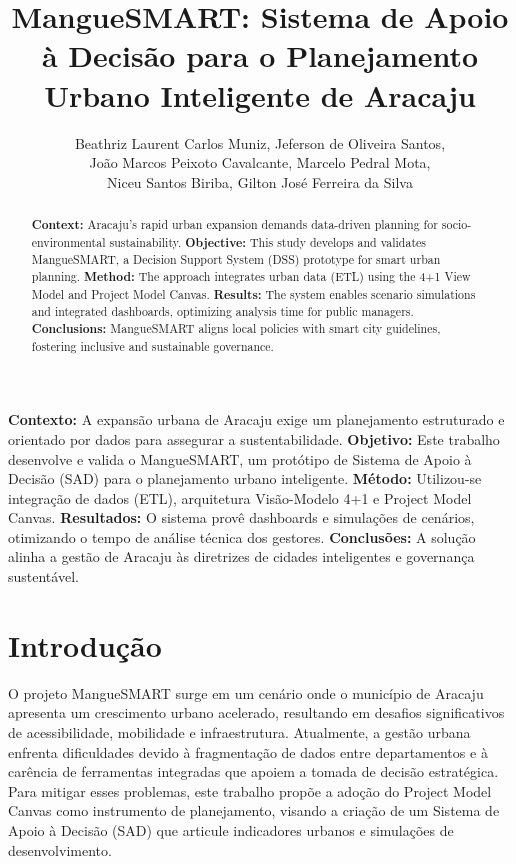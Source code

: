 \documentclass[12pt]{article}
\title{MangueSMART: Sistema de Apoio à Decisão para o Planejamento Urbano Inteligente de Aracaju}
\author{Beathriz Laurent Carlos Muniz\inst{1}, Jeferson de Oliveira Santos\inst{2}, \\João Marcos Peixoto Cavalcante\inst{3}, Marcelo Pedral Mota\inst{4}, \\Niceu Santos Biriba\inst{5}, Gilton José Ferreira da Silva\inst{2} }
\begin{document}
 

\maketitle

\begin{abstract} \textbf{Context:} Aracaju's rapid urban expansion demands data-driven planning for socio-environmental sustainability. \textbf{Objective:} This study develops and validates MangueSMART, a Decision Support System (DSS) prototype for smart urban planning. \textbf{Method:} The approach integrates urban data (ETL) using the 4+1 View Model and Project Model Canvas. \textbf{Results:} The system enables scenario simulations and integrated dashboards, optimizing analysis time for public managers. \textbf{Conclusions:} MangueSMART aligns local policies with smart city guidelines, fostering inclusive and sustainable governance. \end{abstract}
     
\begin{resumo} \textbf{Contexto:} A expansão urbana de Aracaju exige um planejamento estruturado e orientado por dados para assegurar a sustentabilidade. \textbf{Objetivo:} Este trabalho desenvolve e valida o MangueSMART, um protótipo de Sistema de Apoio à Decisão (SAD) para o planejamento urbano inteligente. \textbf{Método:} Utilizou-se integração de dados (ETL), arquitetura Visão-Modelo 4+1 e Project Model Canvas. \textbf{Resultados:} O sistema provê dashboards e simulações de cenários, otimizando o tempo de análise técnica dos gestores. \textbf{Conclusões:} A solução alinha a gestão de Aracaju às diretrizes de cidades inteligentes e governança sustentável. \end{resumo}

\section{Introdução} \label{sec:introducao}
O projeto MangueSMART surge em um cenário onde o município de Aracaju apresenta um crescimento urbano acelerado, resultando em desafios significativos de acessibilidade, mobilidade e infraestrutura. Atualmente, a gestão urbana enfrenta dificuldades devido à fragmentação de dados entre departamentos e à carência de ferramentas integradas que apoiem a tomada de decisão estratégica. Para mitigar esses problemas, este trabalho propõe a adoção do Project Model Canvas como instrumento de planejamento, visando a criação de um Sistema de Apoio à Decisão (SAD) que articule indicadores urbanos e simulações de desenvolvimento.
\end{document}
